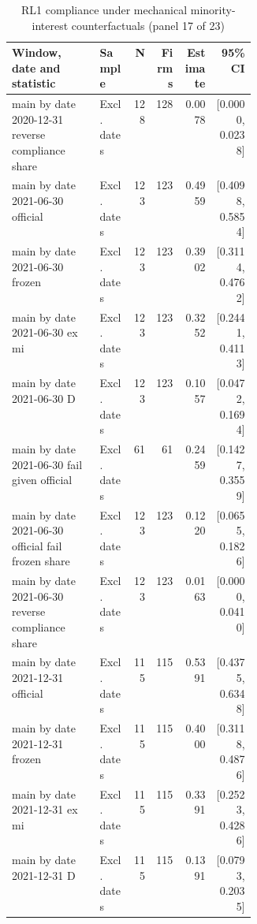\begin{table}[!htbp]\centering\scriptsize
\caption{RL1 compliance under mechanical minority-interest counterfactuals (panel 17 of 23)}
\begin{threeparttable}
\begin{tabular}{p{0.36\linewidth}lrrrr}
\toprule
Window, date and statistic & Sample & N & Firms & Estimate & 95\% CI \\
\midrule
main by date 2020-12-31 reverse compliance share & Excl. dates & 128 & 128 & 0.0078 & [0.0000, 0.0238] \\
main by date 2021-06-30 official & Excl. dates & 123 & 123 & 0.4959 & [0.4098, 0.5854] \\
main by date 2021-06-30 frozen & Excl. dates & 123 & 123 & 0.3902 & [0.3114, 0.4762] \\
main by date 2021-06-30 ex mi & Excl. dates & 123 & 123 & 0.3252 & [0.2441, 0.4113] \\
main by date 2021-06-30 D & Excl. dates & 123 & 123 & 0.1057 & [0.0472, 0.1694] \\
main by date 2021-06-30 fail given official & Excl. dates & 61 & 61 & 0.2459 & [0.1427, 0.3559] \\
main by date 2021-06-30 official fail frozen share & Excl. dates & 123 & 123 & 0.1220 & [0.0655, 0.1826] \\
main by date 2021-06-30 reverse compliance share & Excl. dates & 123 & 123 & 0.0163 & [0.0000, 0.0410] \\
main by date 2021-12-31 official & Excl. dates & 115 & 115 & 0.5391 & [0.4375, 0.6348] \\
main by date 2021-12-31 frozen & Excl. dates & 115 & 115 & 0.4000 & [0.3118, 0.4876] \\
main by date 2021-12-31 ex mi & Excl. dates & 115 & 115 & 0.3391 & [0.2523, 0.4286] \\
main by date 2021-12-31 D & Excl. dates & 115 & 115 & 0.1391 & [0.0793, 0.2035] \\
\bottomrule
\end{tabular}
\begin{tablenotes}[flushleft]\footnotesize

\end{tablenotes}
\end{threeparttable}
\end{table}
